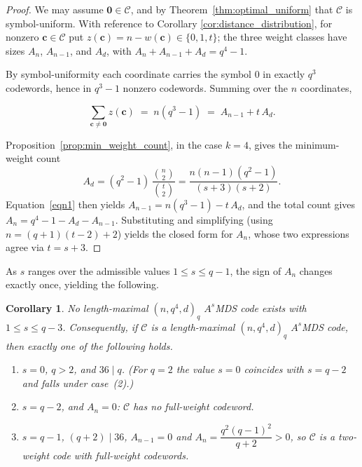 \documentclass[12pt, letterpaper]{article}
\theoremstyle{plain}
\newtheorem{corollary}[theorem]{Corollary}
\theoremstyle{definition}
\begin{document}
	\begin{proof}
		We may assume $\mathbf 0 \in \mathcal C$, and by Theorem~\ref{thm:optimal_uniform} that $\mathcal C$ is symbol-uniform. With reference to Corollary \ref{cor:distance_distribution}, for nonzero $\mathbf{c}\in \mathcal C$ put $z(\mathbf c) = n - w(\mathbf c) \in \{0,1,t\}$; the three weight classes have sizes $A_n$, $A_{n-1}$, and $A_d$, with $A_n + A_{n-1} + A_d = q^4-1$.

		By symbol-uniformity each coordinate carries the symbol $0$ in exactly $q^3$ codewords, hence in $q^3-1$ nonzero codewords. Summing over the $n$ coordinates,
		 
		\begin{equation}
			\sum_{\mathbf c \ne \mathbf 0} z(\mathbf c) \;=\; n(q^3-1) \;=\; A_{n-1} + t\,A_d. \label{eqn1}
		\end{equation}

		Proposition~\ref{prop:min_weight_count}, in the case $k=4$, gives the minimum-weight count
		\[
		A_d = (q^2-1)\,\frac{\binom n2}{\binom t2} = \frac{n(n-1)(q^2-1)}{(s+3)(s+2)}.
		\]
		Equation~\eqref{eqn1} then yields $A_{n-1} = n(q^3-1) - t\,A_d$, and the total count gives $A_n = q^4-1-A_d-A_{n-1}$. Substituting and simplifying (using $n = (q+1)(t-2)+2$) yields the closed form for $A_n$, whose two expressions agree via $t = s+3$.
	\end{proof}

	As $s$ ranges over the admissible values $1 \le s \le q-1$, the sign of $A_n$ changes exactly once, yielding the following.

	\begin{corollary}\label{cor:dim4_trichotomy}
		No length-maximal $(n,q^4,d)_q$ $A^s$MDS code exists with $1 \le s \le q-3$. Consequently, if $\mathcal C$ is a length-maximal $(n,q^4,d)_q$ $A^s$MDS code, then exactly one of the following holds.
		\begin{enumerate}
			\item $s=0$, $q>2$, and $36\mid q$. (For $q=2$ the value $s=0$ coincides with $s=q-2$ and falls under case~(2).)
			\item $s = q-2$, and $A_n = 0$: $\mathcal C$ has no full-weight codeword.
			\item $s = q-1$, $(q+2)\mid 36$,  $A_{n-1} = 0$ and $A_n = \dfrac{q^2(q-1)^2}{q+2} > 0$, so $\mathcal C$ is a two-weight code with full-weight codewords.
		\end{enumerate}
	\end{corollary}
\end{document}
